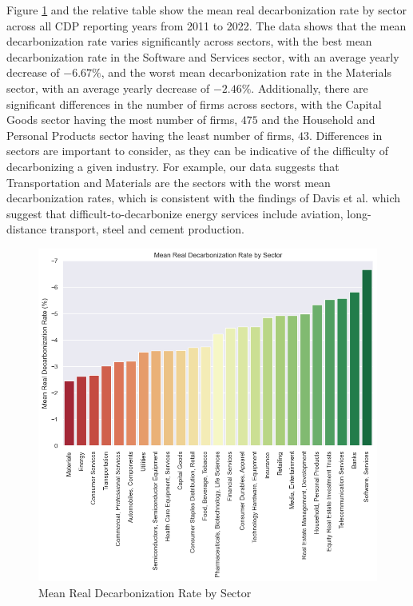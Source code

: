 \noindent Figure \ref{fig:mean-decarbonization-rate-by-sector} and the relative table show the mean real decarbonization rate by sector across all CDP reporting years from 2011 to 2022. The data shows that the mean decarbonization rate varies significantly across sectors, with the best mean decarbonization rate in the Software and Services sector, with an average yearly decrease of $-6.67 \%$, and the worst mean decarbonization rate in the Materials sector, with an average yearly decrease of $-2.46\%$. Additionally, there are significant differences in the number of firms across sectors, with the Capital Goods sector having the most number of firms, $475$ and the Household and Personal Products sector having the least number of firms, $43$. Differences in sectors are important to consider, as they can be indicative of the difficulty of decarbonizing a given industry. For example, our data suggests that Transportation and Materials are the sectors with the worst mean decarbonization rates, which is consistent with the findings of Davis et al. \cite{Davis2018Net-zero} which suggest that difficult-to-decarbonize energy services include aviation, long-distance transport, steel and cement production.

\begin{figure}[H]
    \begin{center}
    \includegraphics[width=5in]{figures/mean_decarbonization_rate_by_sector.png}
    \caption{Mean Real Decarbonization Rate by Sector}
    \label{fig:mean-decarbonization-rate-by-sector}
    \end{center}
\end{figure}


